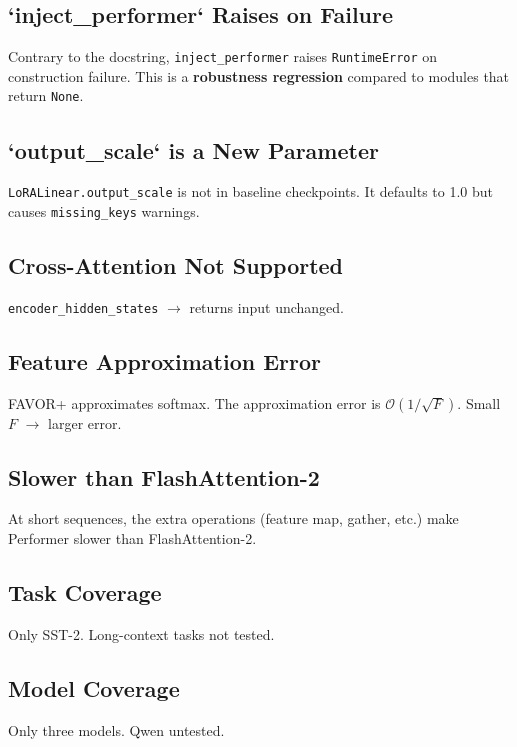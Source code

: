 \subsection{`inject\_performer` Raises on Failure}

Contrary to the docstring, \texttt{inject\_performer} raises \texttt{RuntimeError} on 
construction failure. This is a \textbf{robustness regression} compared to 
modules that return \texttt{None}.

\subsection{`output\_scale` is a New Parameter}

\texttt{LoRALinear.output\_scale} is not in baseline checkpoints. It defaults to 
1.0 but causes \texttt{missing\_keys} warnings.

\subsection{Cross-Attention Not Supported}

\texttt{encoder\_hidden\_states} $\to$ returns input unchanged.

\subsection{Feature Approximation Error}

FAVOR+ approximates softmax. The approximation error is $\mathcal{O}(1/\sqrt{F})$. 
Small $F$ $\to$ larger error.

\subsection{Slower than FlashAttention-2}

At short sequences, the extra operations (feature map, gather, etc.) make 
Performer slower than FlashAttention-2.

\subsection{Task Coverage}

Only SST-2. Long-context tasks not tested.

\subsection{Model Coverage}

Only three models. Qwen untested.

